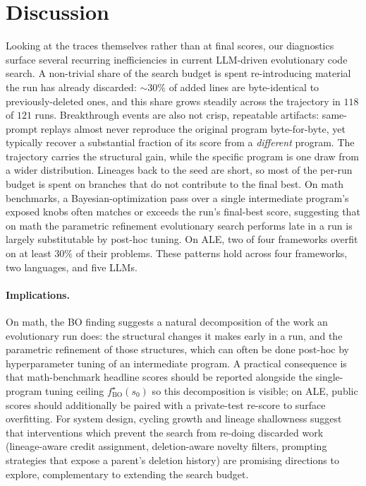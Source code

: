 \section{Discussion}
\label{sec:discussion}

Looking at the traces themselves rather than at final scores, our diagnostics surface several recurring inefficiencies in current LLM-driven evolutionary code search. A non-trivial share of the search budget is spent re-introducing material the run has already discarded: $\sim\!30\%$ of added lines are byte-identical to previously-deleted ones, and this share grows steadily across the trajectory in $118$ of $121$ runs. Breakthrough events are also not crisp, repeatable artifacts: same-prompt replays almost never reproduce the original program byte-for-byte, yet typically recover a substantial fraction of its score from a \emph{different} program. The trajectory carries the structural gain, while the specific program is one draw from a wider distribution. Lineages back to the seed are short, so most of the per-run budget is spent on branches that do not contribute to the final best. On math benchmarks, a Bayesian-optimization pass over a single intermediate program's exposed knobs often matches or exceeds the run's final-best score, suggesting that on math the parametric refinement evolutionary search performs late in a run is largely substitutable by post-hoc tuning. On ALE, two of four frameworks overfit on at least $30\%$ of their problems. These patterns hold across four frameworks, two languages, and five LLMs.

\paragraph{Implications.}
On math, the BO finding suggests a natural decomposition of the work an evolutionary run does: the structural changes it makes early in a run, and the parametric refinement of those structures, which can often be done post-hoc by hyperparameter tuning of an intermediate program. A practical consequence is that math-benchmark headline scores should be reported alongside the single-program tuning ceiling $f^{\star}_{\mathrm{BO}}(s_0)$ so this decomposition is visible; on ALE, public scores should additionally be paired with a private-test re-score to surface overfitting. For system design, cycling growth and lineage shallowness suggest that interventions which prevent the search from re-doing discarded work (lineage-aware credit assignment, deletion-aware novelty filters, prompting strategies that expose a parent's deletion history) are promising directions to explore, complementary to extending the search budget.

